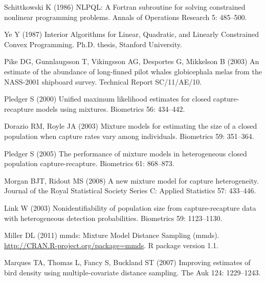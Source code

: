 \documentclass[10pt]{article}
\begin{document}
\begin{thebibliography}{10}
Schittkowski K (1986) {NLPQL: A Fortran subroutine for solving constrained
  nonlinear programming problems}.
\newblock Annals of Operations Research 5: 485--500.

Ye Y (1987) {Interior Algorithms for Linear, Quadratic, and Linearly
  Constrained Convex Programming}.
\newblock Ph.D. thesis, Stanford University.

Pike DG, Gunnlaugsson T, Vikingsson AG, Desportes G, Mikkelson B (2003) {An
  estimate of the abundance of long-finned pilot whales globicephala melas from
  the NASS-2001 shipboard survey}.
\newblock Technical Report SC/11/AE/10.

Pledger S (2000) {Unified maximum likelihood estimates for closed
  capture-recapture models using mixtures}.
\newblock Biometrics 56: 434--442.

Dorazio RM, Royle JA (2003) {Mixture models for estimating the size of a
  closed population when capture rates vary among individuals}.
\newblock Biometrics 59: 351--364.

Pledger S (2005) {The performance of mixture models in heterogeneous closed
  population capture-recapture}.
\newblock Biometrics 61: 868--873.

Morgan BJT, Ridout MS (2008) {A new mixture model for capture heterogeneity}.
\newblock Journal of the Royal Statistical Society Series C: Applied Statistics
  57: 433--446.

Link W (2003) {Nonidentifiability of population size from capture-recapture
  data with heterogeneous detection probabilities}.
\newblock Biometrics 59: 1123--1130.

Miller DL (2011) mmds: Mixture Model Distance Sampling (mmds).
\newblock \urlprefix\url{http://CRAN.R-project.org/package=mmds}.
\newblock R package version 1.1.

Marques TA, Thomas L, Fancy S, Buckland ST (2007) {Improving estimates of bird
  density using multiple-covariate distance sampling}.
\newblock The Auk 124: 1229--1243.


\end{thebibliography}
\end{document}
